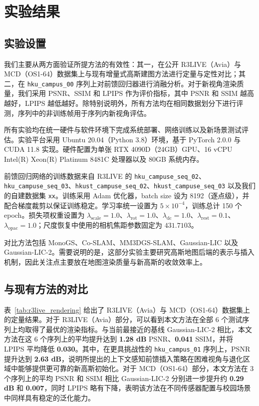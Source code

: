 
\section{实验结果}



\subsection{实验设置}
我们主要从两方面验证所提方法的有效性：其一，在公开 R3LIVE（Avia）与 MCD（OS1-64）数据集上与现有增量式高斯建图方法进行定量与定性对比；其二，在 \texttt{hku\_campus\_00} 序列上对前馈回归器进行消融分析。对于新视角渲染质量，我们采用 PSNR、SSIM 和 LPIPS 作为评价指标，其中 PSNR 和 SSIM 越高越好，LPIPS 越低越好。除特别说明外，所有方法均在相同数据划分下进行评测，序列中的非训练帧用于序列内新视角评估。

所有实验均在统一硬件与软件环境下完成系统部署、网络训练以及新场景测试评估。实验平台采用 Ubuntu 20.04（Python 3.8）环境，基于 PyTorch 2.0.0 与 CUDA 11.8 实现。硬件配置为单张 RTX 4090D（24GB）GPU、16 vCPU Intel(R) Xeon(R) Platinum 8481C 处理器以及 80GB 系统内存。

前馈回归网络的训练数据来自 R3LIVE 的 \texttt{hku\_campuse\_seq\_02}、\texttt{hku\_campuse\_seq\_03}、\texttt{hkust\_campuse\_seq\_02}、\texttt{hkust\_campuse\_seq\_03} 以及我们的自建数据集 \texttt{xx}。训练采用 Adam 优化器，batch size 设为 8192（逐点级），并配合梯度裁剪以保证训练稳定。学习率统一设置为 $5\times10^{-4}$，训练总计 150 个 epoch。损失项权重设置为 $\lambda_{\text{scale}}=1.0$、$\lambda_{\text{rot}}=1.0$、$\lambda_{\text{dc}}=1.0$、$\lambda_{\text{rest}}=0.1$、$\lambda_{\text{opac}}=1.0$；尺度恢复中使用的相机焦距参数固定为 $431.7103$。

对比方法包括 MonoGS、Co-SLAM、MM3DGS-SLAM、Gaussian-LIC 以及 Gaussian-LIC-2。需要说明的是，这部分实验主要研究高斯地图后端的表示与插入机制，因此关注点主要放在地图渲染质量与新高斯的收敛效率上。

\subsection{与现有方法的对比}

表~\ref{tab:r3live_rendering} 给出了 R3LIVE（Avia）与 MCD（OS1-64）数据集上的定量结果。对于 R3LIVE（Avia）部分，可以看到本文方法在全部 6 个测试序列上均取得了最优的渲染指标。与当前最接近的基线 Gaussian-LIC-2 相比，本文方法在这 6 个序列上的平均提升达到 \textbf{1.28 dB} PSNR、\textbf{0.041} SSIM，并将 LPIPS 平均降低 \textbf{0.030}。其中，在更具挑战性的 \texttt{hku\_campus\_01} 序列上，PSNR 提升达到 \textbf{2.63 dB}，说明所提出的上下文感知前馈插入策略在困难视角与退化区域中能够提供更可靠的新高斯初始化。对于 MCD（OS1-64）部分，本文方法在 3 个序列上的平均 PSNR 和 SSIM 相比 Gaussian-LIC-2 分别进一步提升约 \textbf{0.29 dB} 和 \textbf{0.007}，同时 LPIPS 略有下降，表明该方法在不同传感器配置与校园场景中同样具有稳定的泛化能力。

